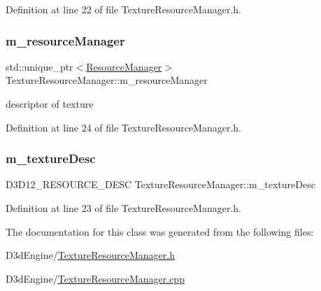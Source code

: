 Definition at line 22 of file Texture\+Resource\+Manager.\+h.

\mbox{\label{class_texture_resource_manager_a789f95efcad1717efd90f7e6ec1ee0ea}} 
\subsubsection{\texorpdfstring{m\+\_\+resource\+Manager}{m\_resourceManager}}
{\footnotesize\ttfamily std\+::unique\+\_\+ptr$<$\mbox{\hyperlink{class_resource_manager}{Resource\+Manager}}$>$ Texture\+Resource\+Manager\+::m\+\_\+resource\+Manager\hspace{0.3cm}{\ttfamily [private]}}



descriptor of texture 



Definition at line 24 of file Texture\+Resource\+Manager.\+h.

\mbox{\label{class_texture_resource_manager_a9137a54de5e1a26cf0bb3d37b6b1af93}} 
\subsubsection{\texorpdfstring{m\+\_\+texture\+Desc}{m\_textureDesc}}
{\footnotesize\ttfamily D3\+D12\+\_\+\+R\+E\+S\+O\+U\+R\+C\+E\+\_\+\+D\+E\+SC Texture\+Resource\+Manager\+::m\+\_\+texture\+Desc\hspace{0.3cm}{\ttfamily [private]}}



Definition at line 23 of file Texture\+Resource\+Manager.\+h.



The documentation for this class was generated from the following files\+:\begin{DoxyCompactItemize}
\item 
D3d\+Engine/\mbox{\hyperlink{_texture_resource_manager_8h}{Texture\+Resource\+Manager.\+h}}\item 
D3d\+Engine/\mbox{\hyperlink{_texture_resource_manager_8cpp}{Texture\+Resource\+Manager.\+cpp}}\end{DoxyCompactItemize}
